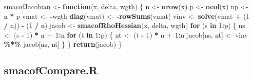 \documentclass[
  12pt,
]{article}
\newenvironment{Shaded}{\begin{snugshade}}{\end{snugshade}}
\newcommand{\ControlFlowTok}[1]{\textcolor[rgb]{0.13,0.29,0.53}{\textbf{#1}}}
\newcommand{\DecValTok}[1]{\textcolor[rgb]{0.00,0.00,0.81}{#1}}
\newcommand{\FunctionTok}[1]{\textcolor[rgb]{0.13,0.29,0.53}{\textbf{#1}}}
\newcommand{\NormalTok}[1]{#1}
\newcommand{\OtherTok}[1]{\textcolor[rgb]{0.56,0.35,0.01}{#1}}
\newcommand{\SpecialCharTok}[1]{\textcolor[rgb]{0.81,0.36,0.00}{\textbf{#1}}}
\begin{document}
\begin{Shaded}
\begin{Highlighting}[]
\NormalTok{smacofJacobian }\OtherTok{\textless{}{-}} \ControlFlowTok{function}\NormalTok{(x, delta, wgth) \{}
\NormalTok{  n }\OtherTok{\textless{}{-}} \FunctionTok{nrow}\NormalTok{(x)}
\NormalTok{  p }\OtherTok{\textless{}{-}} \FunctionTok{ncol}\NormalTok{(x)}
\NormalTok{  np }\OtherTok{\textless{}{-}}\NormalTok{ n }\SpecialCharTok{*}\NormalTok{ p}
\NormalTok{  vmat }\OtherTok{\textless{}{-}} \SpecialCharTok{{-}}\NormalTok{wgth}
  \FunctionTok{diag}\NormalTok{(vmat) }\OtherTok{\textless{}{-}} \SpecialCharTok{{-}}\FunctionTok{rowSums}\NormalTok{(vmat)}
\NormalTok{  vinv }\OtherTok{\textless{}{-}} \FunctionTok{solve}\NormalTok{(vmat }\SpecialCharTok{+}\NormalTok{ (}\DecValTok{1} \SpecialCharTok{/}\NormalTok{ n)) }\SpecialCharTok{{-}}\NormalTok{ (}\DecValTok{1} \SpecialCharTok{/}\NormalTok{ n)}
\NormalTok{  jacob }\OtherTok{\textless{}{-}} \FunctionTok{smacofRhoHessian}\NormalTok{(x, delta, wgth)}
  \ControlFlowTok{for}\NormalTok{ (s }\ControlFlowTok{in} \DecValTok{1}\SpecialCharTok{:}\NormalTok{p) \{}
\NormalTok{    ns }\OtherTok{\textless{}{-}}\NormalTok{ (s }\SpecialCharTok{{-}} \DecValTok{1}\NormalTok{) }\SpecialCharTok{*}\NormalTok{ n }\SpecialCharTok{+} \DecValTok{1}\SpecialCharTok{:}\NormalTok{n}
    \ControlFlowTok{for}\NormalTok{ (t }\ControlFlowTok{in} \DecValTok{1}\SpecialCharTok{:}\NormalTok{p) \{}
\NormalTok{      nt }\OtherTok{\textless{}{-}}\NormalTok{ (t }\SpecialCharTok{{-}} \DecValTok{1}\NormalTok{) }\SpecialCharTok{*}\NormalTok{ n }\SpecialCharTok{+} \DecValTok{1}\SpecialCharTok{:}\NormalTok{n}
\NormalTok{      jacob[ns, nt] }\OtherTok{\textless{}{-}}\NormalTok{ vinv }\SpecialCharTok{\%*\%}\NormalTok{ jacob[ns, nt]}
\NormalTok{    \}}
\NormalTok{  \}}
  \FunctionTok{return}\NormalTok{(jacob)}
\NormalTok{\}}
\end{Highlighting}
\end{Shaded}

\subsection{smacofCompare.R}\label{smacofcompare.r}
\end{document}
